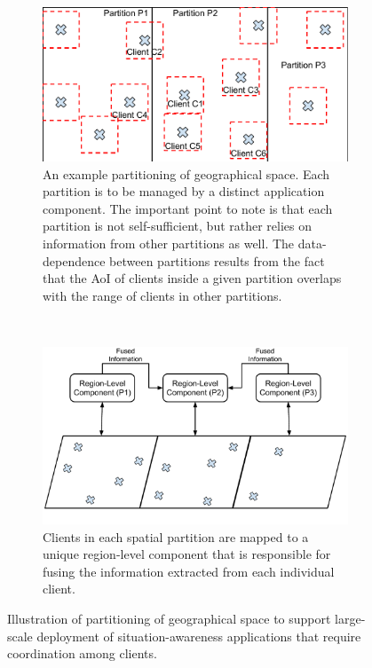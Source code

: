 \begin{figure}
\centering
\begin{subfigure}{0.45\textwidth}
  \centering
  \includegraphics[width=\linewidth]{figures/mechanisms/spatial_ctx_mgmt/aoi_range_partition.pdf}
  \caption{An example partitioning of geographical space. Each partition is to be managed by a distinct application component. The important point to note is that each partition is not self-sufficient, but rather relies on information from other partitions as well. The data-dependence between partitions results from the fact that the AoI of clients inside a given partition overlaps with the range of clients in other partitions.}
  \label{fig:aoi_range_partition}
\end{subfigure}%
~~~
\begin{subfigure}{0.45\textwidth}
  \centering
  \includegraphics[width=\linewidth]{figures/mechanisms/spatial_ctx_mgmt/aoi_range_partition_mapping.pdf}
  \caption{Clients in each spatial partition are mapped to a unique region-level component that is responsible for fusing the information extracted from each individual client.}
  \label{fig:aoi_range_partition_mapping}
\end{subfigure}
\caption{Illustration of partitioning of geographical space to support large-scale deployment of situation-awareness applications that require coordination among clients.}
\label{fig:spatial_partitioning}
\end{figure}

